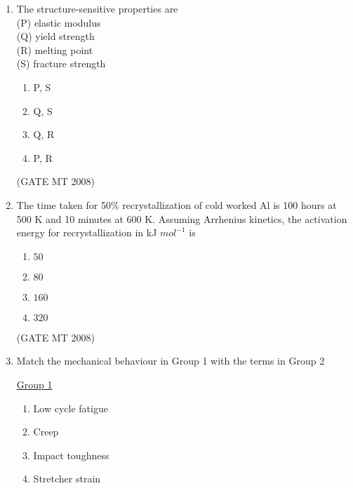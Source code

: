 \documentclass[11pt, letterpaper]{article}
\theoremstyle{remark}
\begin{document}
\begin{enumerate}[label=Q.\arabic*]
\item The structure-sensitive properties are\\
(P) elastic modulus\\(Q) yield strength\\ (R) melting point\\(S) fracture strength
\vspace{-0.9em}
\begin{multicols}{4}
 \begin{enumerate}[label=(\MakeUppercase{\alph*})]
  \item P, S
  \item Q, S
  \item Q, R
  \item P, R
 \end{enumerate}
\end{multicols}
\vspace{-5mm}
\hfill(GATE MT 2008)

\item The time taken for 50\% recrystallization of cold worked Al is 100 hours at 500 K and 10 minutes at 600 K. Assuming Arrhenius kinetics, the activation energy for recrystallization in kJ $mol^{-1}$ is
\vspace{-0.9em}
\begin{multicols}{4}
 \begin{enumerate}[label=(\MakeUppercase{\alph*})]
  \item $50$
  \item $80$
  \item $160$
  \item $320$
 \end{enumerate}
\end{multicols}
\vspace{-5mm}
\hfill(GATE MT 2008)

\item Match the mechanical behaviour in Group 1 with the terms in Group 2\\ 
\begin{multicols}{2}
    \underline{Group 1}
    \begin{enumerate}[label=(\Alph*), start=16]
        \item Low cycle fatigue
        \item Creep
        \item Impact toughness
        \item Stretcher strain\\
    \end{enumerate}



\end{multicols}
\end{enumerate}
\end{document}
